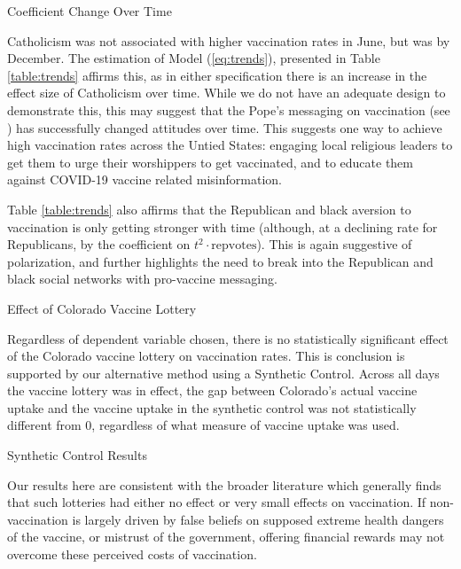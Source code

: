 \documentclass[12pt]{article}
\begin{document}
\begin{spacing}{1.5}
		\begin{table}
			\centering
			\caption{Coefficient Change Over Time}
			
			\label{table:trends}
		\end{table}
		
		Catholicism was not associated with higher vaccination rates in June, but was by December. The estimation of Model (\ref{eq:trends}), presented in Table \ref{table:trends} affirms this, as in either specification there is an increase in the effect size of Catholicism over time. While we do not have an adequate design to demonstrate this, this may suggest that the Pope's messaging on vaccination (see \citet{gawel_effects_2021}) has successfully changed attitudes over time. This suggests one way to achieve high vaccination rates across the Untied States: engaging local religious leaders to get them to urge their worshippers to get vaccinated, and to educate them against COVID-19 vaccine related misinformation.
		
		Table \ref{table:trends} also affirms that the Republican and black aversion to vaccination is only getting stronger with time (although, at a declining rate for Republicans, by the coefficient on $t^2\cdot \textrm{repvotes}$). This is again suggestive of polarization, and further highlights the need to break into the Republican and black social networks with pro-vaccine messaging.
		
		\begin{table}
			\centering
			\caption{Effect of Colorado Vaccine Lottery}
			\centerline{}
			\label{table:didresults}
		\end{table}
		
		Regardless of dependent variable chosen, there is no statistically significant effect of the Colorado vaccine lottery on vaccination rates. This is conclusion is supported by our alternative method using a Synthetic Control. Across all days the vaccine lottery was in effect, the gap between Colorado's actual vaccine uptake and the vaccine uptake in the synthetic control was not statistically different from 0, regardless of what measure of vaccine uptake was used.
		
		\begin{table}
			\caption{Synthetic Control Results}
			
		\end{table}
		
		Our results here are consistent with the broader literature which generally finds that such lotteries had either no effect or very small effects on vaccination. If non-vaccination is largely driven by false beliefs on supposed extreme health dangers of the vaccine, or mistrust of the government, offering financial rewards may not overcome these perceived costs of vaccination.
		

\end{spacing}
\end{document}
